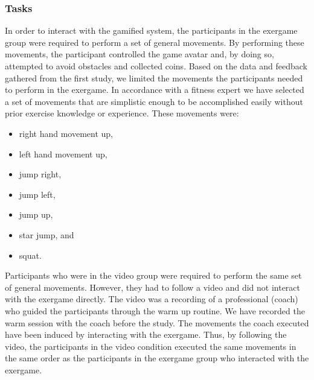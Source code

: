 \subsubsection{Tasks}
In order to interact with the gamified system, the participants in the exergame group were required to perform a set of general movements. By performing these movements, the participant controlled the game avatar and, by doing so, attempted to avoid obstacles and collected coins. Based on the data and feedback gathered from the first study, we limited the movements the participants needed to perform in the exergame. In accordance with a fitness expert we have selected a set of movements that are simplistic enough to be accomplished easily without prior exercise knowledge or experience. These movements were: 
\begin{itemize}
\item right hand movement up,
\item left hand movement up,
\item jump right,
\item jump left,
\item jump up, 
\item star jump, and
\item squat.
\end{itemize}
Participants who were in the video group were required to perform the same set of general movements. However, they had to follow a video and did not interact with the exergame directly. The video was a recording of a professional (coach) who guided the participants through the warm up routine. We have recorded the warm session with the coach before the study. The movements the coach executed have been induced by interacting with the exergame. Thus, by following the video, the participants in the video condition executed the same movements in the same order as the participants in the exergame group who interacted with the exergame.
